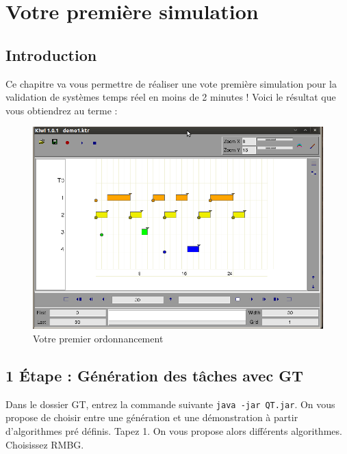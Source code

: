 \section{Votre première simulation}
\subsection{Introduction}
Ce chapitre va vous permettre de réaliser une vote première simulation pour la validation de systèmes temps réel en moins de 2 minutes  \smiley ! Voici le résultat que vous obtiendrez au terme : 
\begin{figure}[htbp]
  \centering
  \includegraphics[scale=0.60]{img/RMBG}
  \caption{Votre premier ordonnancement}
  \label{fig:RMtuto}
\end{figure}

\subsection{1 Étape : Génération des tâches avec GT} 
Dans le dossier GT, entrez la commande suivante \verb+java -jar QT.jar+. On vous propose de choisir entre une génération et une démonstration à partir d'algorithmes pré définis. Tapez 1. On vous propose alors différents algorithmes. Choisissez RMBG. 

